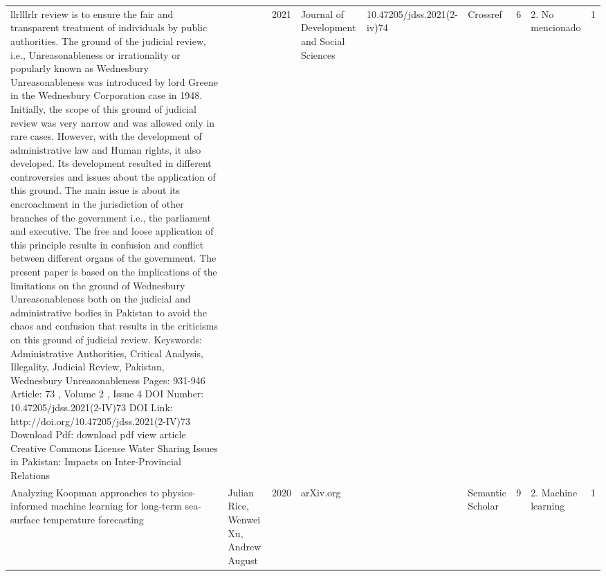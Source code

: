 \begin{longtable}{lllllllll}{llrlllrlr}
review is to ensure the fair and transparent treatment of individuals by public authorities. The ground of the judicial review, i.e., Unreasonableness or irrationality or popularly known as Wednesbury Unreasonableness was introduced by lord Greene in the Wednesbury Corporation case in 1948. Initially, the scope of this ground of judicial review was very narrow and was allowed only in rare cases. However, with the development of administrative law and Human rights, it also developed. Its development resulted in different controversies and issues about the application of this ground. The main issue is about its encroachment in the jurisdiction of other branches of the government i.e., the parliament and executive. The free and loose application of this principle results in confusion and conflict between different organs of the government. The present paper is based on the implications of the limitations on the ground of Wednesbury Unreasonableness both on the judicial and administrative bodies in Pakistan to avoid the chaos and confusion that results in the criticisms on this ground of judicial review. Keyswords:	Administrative Authorities, Critical Analysis, Illegality, Judicial Review, Pakistan, Wednesbury Unreasonableness Pages:	931-946 Article:	73 , Volume 2 , Issue 4 DOI Number:	10.47205/jdss.2021(2-IV)73 DOI Link:	http://doi.org/10.47205/jdss.2021(2-IV)73 Download Pdf:	 download pdf  view article Creative Commons License Water Sharing Issues in Pakistan: Impacts on Inter-Provincial Relations &  & 2021 & Journal of Development and Social Sciences & 10.47205/jdss.2021(2-iv)74 & Crossref & 6 & 2. No mencionado & 1 \\
Analyzing Koopman approaches to physics-informed machine learning for long-term sea-surface temperature forecasting & Julian Rice, Wenwei Xu, Andrew August & 2020 & arXiv.org &  & Semantic Scholar & 9 & 2. Machine learning & 1 \\

\end{longtable}
